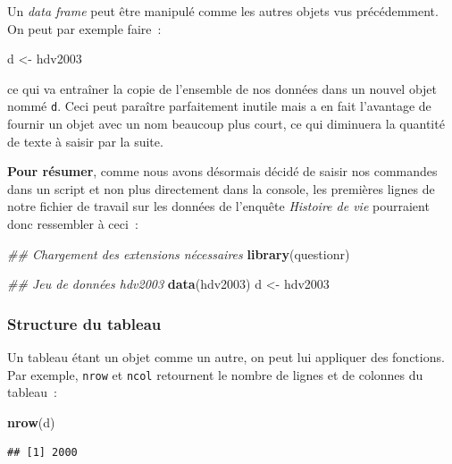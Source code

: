 \documentclass[12pt,]{book}
\newenvironment{Shaded}{\begin{snugshade}}{\end{snugshade}}
\newcommand{\CommentTok}[1]{\textcolor[rgb]{0.37,0.37,0.37}{\textit{#1}}}
\newcommand{\KeywordTok}[1]{\textcolor[rgb]{0.27,0.27,0.27}{\textbf{#1}}}
\newcommand{\NormalTok}[1]{#1}
\newcommand{\StringTok}[1]{\textcolor[rgb]{0.5,0.5,0.5}{#1}}
\begin{document}
Un \emph{data frame} peut être manipulé comme les autres objets vus précédemment. On peut par exemple faire~:

\begin{Shaded}
\begin{Highlighting}[]
\NormalTok{d <-}\StringTok{ }\NormalTok{hdv2003}
\end{Highlighting}
\end{Shaded}

ce qui va entraîner la copie de l'ensemble de nos données dans un nouvel objet nommé \texttt{d}. Ceci peut paraître parfaitement inutile mais a en fait l'avantage de fournir un objet avec un nom beaucoup plus court, ce qui diminuera la quantité de texte à saisir par la suite.

\textbf{Pour résumer}, comme nous avons désormais décidé de saisir nos commandes dans un script et non plus directement dans la console, les premières lignes de notre fichier de travail sur les données de l'enquête \emph{Histoire de vie} pourraient donc ressembler à ceci~:

\begin{Shaded}
\begin{Highlighting}[]
\CommentTok{## Chargement des extensions nécessaires}
\KeywordTok{library}\NormalTok{(questionr)}

\CommentTok{## Jeu de données hdv2003}
\KeywordTok{data}\NormalTok{(hdv2003)}
\NormalTok{d <-}\StringTok{ }\NormalTok{hdv2003}
\end{Highlighting}
\end{Shaded}

\hypertarget{structure-du-tableau}{%
\subsubsection{Structure du tableau}\label{structure-du-tableau}}

Un tableau étant un objet comme un autre, on peut lui appliquer des fonctions. Par exemple, \texttt{nrow} et \texttt{ncol} retournent le nombre de lignes et de colonnes du tableau~:

\begin{Shaded}
\begin{Highlighting}[]
\KeywordTok{nrow}\NormalTok{(d)}
\end{Highlighting}
\end{Shaded}

\begin{verbatim}
## [1] 2000
\end{verbatim}
\end{document}

